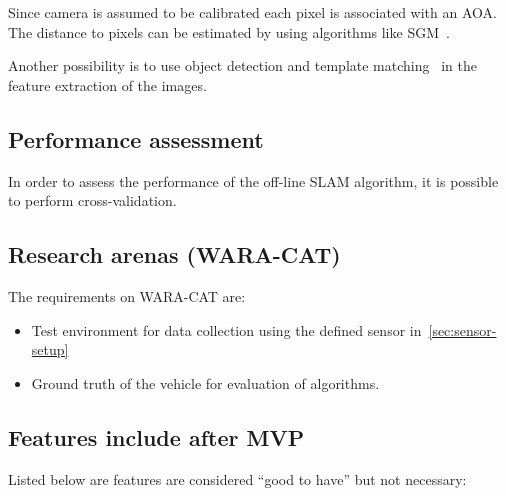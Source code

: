 Since camera is assumed to be calibrated each pixel is associated with an \gls{AOA}. The distance to pixels can be estimated by using algorithms like \gls{SGM}~\cite{hirschmuller2005accurate}.


Another possibility is to use object detection and template
matching~\cite{Brunelli:2009:TMT:1643435} in the feature extraction of
the images.

\subsection{Performance assessment}

In order to assess the performance of the off-line \gls{SLAM}
algorithm, it is possible to perform cross-validation.

\subsection{Research arenas (WARA-CAT)}


The requirements on WARA-CAT are:
\begin{itemize}
  \item Test environment for data collection using the defined sensor
    in~\ref{sec:sensor-setup}
\item Ground truth of the vehicle for evaluation of algorithms.
\end{itemize}


\subsection{Features include after MVP}\label{sec:features}

Listed below are features are considered ``good to have'' but not
necessary:

